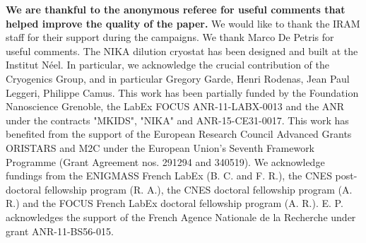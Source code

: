 \documentclass[twocolumn,traditabstract]{aa}
\begin{document}
\begin{acknowledgements}
{\bf We are thankful to the anonymous referee for useful comments that helped improve the quality of the paper.}
We would like to thank the IRAM staff for their support during the campaigns. 
We thank Marco De Petris for useful comments.
The NIKA dilution cryostat has been designed and built at the Institut N\'eel. In particular, we acknowledge the crucial contribution of the Cryogenics Group, and  in particular Gregory Garde, Henri Rodenas, Jean Paul Leggeri, Philippe Camus. 
This work has been partially funded by the Foundation Nanoscience Grenoble, the LabEx FOCUS ANR-11-LABX-0013 and the ANR under the contracts "MKIDS", "NIKA" and ANR-15-CE31-0017. 
This work has benefited from the support of the European Research Council Advanced Grants ORISTARS and M2C under the European Union's Seventh Framework Programme (Grant Agreement nos. 291294 and 340519).
We acknowledge fundings from the ENIGMASS French LabEx (B. C. and F. R.), the CNES post-doctoral fellowship program (R. A.),  the CNES doctoral fellowship program (A. R.) and the FOCUS French LabEx doctoral fellowship program (A. R.).
E. P. acknowledges the support of the French Agence Nationale de la Recherche under grant ANR-11-BS56-015.
\end{acknowledgements}


\end{document}
